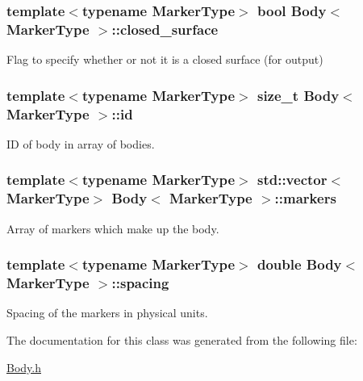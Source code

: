\subsubsection[{\texorpdfstring{closed\+\_\+surface}{closed_surface}}]{\setlength{\rightskip}{0pt plus 5cm}template$<$typename Marker\+Type$>$ bool {\bf Body}$<$ Marker\+Type $>$\+::closed\+\_\+surface\hspace{0.3cm}{\ttfamily [protected]}}\hypertarget{class_body_a2701bdb00789d26ed72d6138d2e21bcb}{}\label{class_body_a2701bdb00789d26ed72d6138d2e21bcb}


Flag to specify whether or not it is a closed surface (for output) 

\subsubsection[{\texorpdfstring{id}{id}}]{\setlength{\rightskip}{0pt plus 5cm}template$<$typename Marker\+Type$>$ size\+\_\+t {\bf Body}$<$ Marker\+Type $>$\+::id\hspace{0.3cm}{\ttfamily [protected]}}\hypertarget{class_body_a9d5166d7419f303190b6c6543e67e815}{}\label{class_body_a9d5166d7419f303190b6c6543e67e815}


ID of body in array of bodies. 

\subsubsection[{\texorpdfstring{markers}{markers}}]{\setlength{\rightskip}{0pt plus 5cm}template$<$typename Marker\+Type$>$ std\+::vector$<$Marker\+Type$>$ {\bf Body}$<$ Marker\+Type $>$\+::markers\hspace{0.3cm}{\ttfamily [protected]}}\hypertarget{class_body_a4e0ac821f2331ec67793a44e36c855e3}{}\label{class_body_a4e0ac821f2331ec67793a44e36c855e3}


Array of markers which make up the body. 

\subsubsection[{\texorpdfstring{spacing}{spacing}}]{\setlength{\rightskip}{0pt plus 5cm}template$<$typename Marker\+Type$>$ double {\bf Body}$<$ Marker\+Type $>$\+::spacing\hspace{0.3cm}{\ttfamily [protected]}}\hypertarget{class_body_a1d4ac2e6fdbc946d5eab0973fd78770b}{}\label{class_body_a1d4ac2e6fdbc946d5eab0973fd78770b}


Spacing of the markers in physical units. 



The documentation for this class was generated from the following file\+:\begin{DoxyCompactItemize}
\item 
\hyperlink{_body_8h}{Body.\+h}\end{DoxyCompactItemize}

